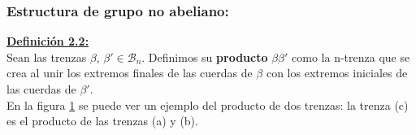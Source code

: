 \documentclass[14pt]{extarticle}
\begin{document}
\begin{center}
     \subsubsection{Estructura de grupo no abeliano:}
\end{center}

\textbf{\underline{Definición 2.2:}}\label{defpro}\\
Sean las trenzas $\beta$, $\beta' \in \mathscr{B}_{n}$. Definimos su \textbf{producto} $\beta \beta'$ como la n-trenza que se crea al unir los extremos finales de las cuerdas de $\beta$ con los extremos iniciales de las cuerdas de $\beta'$.\\

En la figura \ref{grupo0} se puede ver un ejemplo del producto de dos trenzas: la trenza (c) es el producto de las trenzas (a) y (b).\\
   \begin{figure}[h!]
   	\centering
   	\space
   	\caption{}
   	\label{grupo0} 
   \end{figure}
\end{document}

